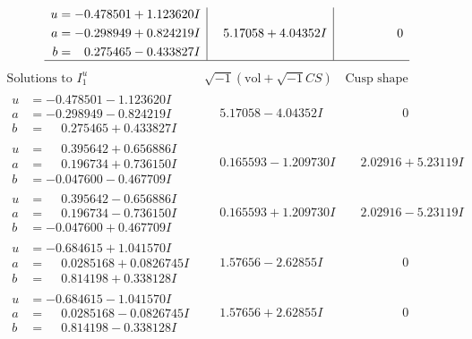 \documentclass[1p]{elsarticle_modified}
\theoremstyle{definition}
\newcommand{\I}{\sqrt{-1}}
\begin{document}
$$\begin{array}{c|c|c}
\begin{aligned}
u &= -0.478501 + 1.123620 I \\
a &= -0.298949 + 0.824219 I \\
b &= \phantom{-}0.275465 - 0.433827 I\end{aligned}
 & \phantom{-}5.17058 + 4.04352 I & \phantom{-0.000000 } 0\\
 \hline 
 \end{array}$$\newpage$$\begin{array}{c|c|c}  
\text{Solutions to }I^u_{1}& \I (\text{vol} + \sqrt{-1}CS) & \text{Cusp shape}\\
 \hline 
\begin{aligned}
u &= -0.478501 - 1.123620 I \\
a &= -0.298949 - 0.824219 I \\
b &= \phantom{-}0.275465 + 0.433827 I\end{aligned}
 & \phantom{-}5.17058 - 4.04352 I & \phantom{-0.000000 } 0 \\ \hline\begin{aligned}
u &= \phantom{-}0.395642 + 0.656886 I \\
a &= \phantom{-}0.196734 + 0.736150 I \\
b &= -0.047600 - 0.467709 I\end{aligned}
 & \phantom{-}0.165593 - 1.209730 I & \phantom{-}2.02916 + 5.23119 I \\ \hline\begin{aligned}
u &= \phantom{-}0.395642 - 0.656886 I \\
a &= \phantom{-}0.196734 - 0.736150 I \\
b &= -0.047600 + 0.467709 I\end{aligned}
 & \phantom{-}0.165593 + 1.209730 I & \phantom{-}2.02916 - 5.23119 I \\ \hline\begin{aligned}
u &= -0.684615 + 1.041570 I \\
a &= \phantom{-}0.0285168 + 0.0826745 I \\
b &= \phantom{-}0.814198 + 0.338128 I\end{aligned}
 & \phantom{-}1.57656 - 2.62855 I & \phantom{-0.000000 } 0 \\ \hline\begin{aligned}
u &= -0.684615 - 1.041570 I \\
a &= \phantom{-}0.0285168 - 0.0826745 I \\
b &= \phantom{-}0.814198 - 0.338128 I\end{aligned}
 & \phantom{-}1.57656 + 2.62855 I & \phantom{-0.000000 } 0 \\ \hline\begin{aligned}

\end{aligned}
\end{array}$$
\end{document}
